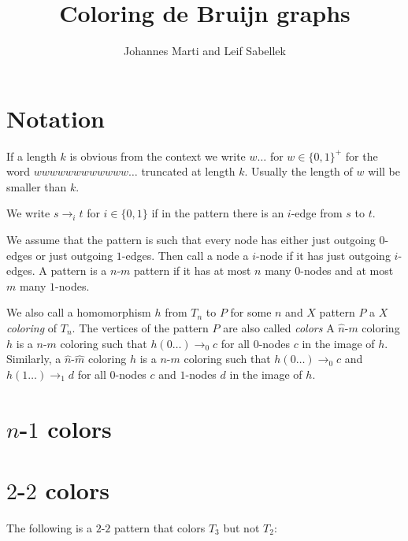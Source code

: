 \documentclass[a4paper]{article}
\title{Coloring de Bruijn graphs}
\author{Johannes Marti and Leif Sabellek}
\begin{document}
\maketitle

\section*{Notation}

If a length $k$ is obvious from the context we write $w\dots$ for $w \in
\{0,1\}^+$ for the word $w w w w w w w w w w w w \dots$ truncated at
length $k$. Usually the length of $w$ will be smaller than $k$.

We write $s \rightarrow_i t$ for $i \in \{0,1\}$ if in the pattern there
is an $i$-edge from $s$ to $t$.

We assume that the pattern is such that every node has either just
outgoing $0$-edges or just outgoing $1$-edges. Then call a node a
$i$-node if it has just outgoing $i$-edges. A pattern is a $n$-$m$
pattern if it has at most $n$ many $0$-nodes and at most $m$ many
$1$-nodes. 

We also call a homomorphism $h$ from $T_n$ to $P$ for some $n$ and $X$
pattern $P$ a \emph{$X$ coloring} of $T_n$. The vertices of the pattern
$P$ are also called \emph{colors} A $\hat{n}$-$m$ coloring $h$ is a
$n$-$m$ coloring such that $h(0\dots) \rightarrow_0 c$ for all $0$-nodes
$c$ in the image of $h$. Similarly, a $\hat{n}$-$\hat{m}$ coloring $h$
is a $n$-$m$ coloring such that $h(0\dots) \rightarrow_0 c$ and
$h(1\dots) \rightarrow_1 d$ for all $0$-nodes $c$ and $1$-nodes $d$ in
the image of $h$.

\section*{$n$-$1$ colors}

\section*{$2$-$2$ colors}

The following is a $2$-$2$ pattern that colors $T_3$ but not $T_2$:
\begin{center}
\end{center}
\end{document}
